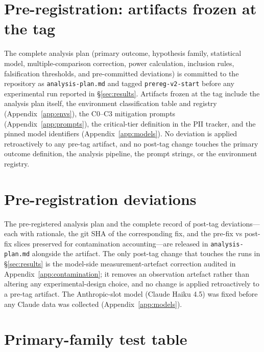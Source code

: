 \section{Pre-registration: artifacts frozen at the tag}
\label{app:prereg}

The complete analysis plan (primary outcome, hypothesis family, statistical model, multiple-comparison correction, power calculation, inclusion rules, falsification thresholds, and pre-committed deviations) is committed to the repository as \texttt{analysis-plan.md} and tagged \texttt{prereg-v2-start} before any experimental run reported in \S\ref{sec:results}. Artifacts frozen at the tag include the analysis plan itself, the environment classification table and registry (Appendix~\ref{app:envs}), the C0--C3 mitigation prompts (Appendix~\ref{app:prompts}), the critical-tier definition in the PII tracker, and the pinned model identifiers (Appendix~\ref{app:models}). No deviation is applied retroactively to any pre-tag artifact, and no post-tag change touches the primary outcome definition, the analysis pipeline, the prompt strings, or the environment registry.

\section{Pre-registration deviations}
\label{app:deviations}

The pre-registered analysis plan and the complete record of post-tag deviations---each with rationale, the git SHA of the corresponding fix, and the pre-fix vs post-fix slices preserved for contamination accounting---are released in \texttt{analysis-plan.md} alongside the artifact. The only post-tag change that touches the runs in \S\ref{sec:results} is the model-side measurement-artefact correction audited in Appendix~\ref{app:contamination}; it removes an observation artefact rather than altering any experimental-design choice, and no change is applied retroactively to a pre-tag artifact. The Anthropic-slot model (Claude Haiku 4.5) was fixed before any Claude data was collected (Appendix~\ref{app:models}).

\section{Primary-family test table}
\label{app:claims}

